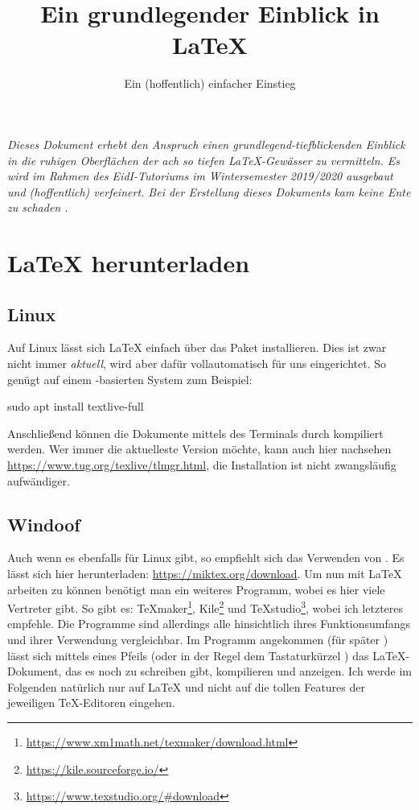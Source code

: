 \documentclass{pnp-skywrath-documentclass/pnp-skywrath}
\title{Ein grundlegender Einblick in \LaTeX}
\subtitle{Ein (hoffentlich) einfacher Einstieg}
\begin{document}
\maketitle
\TableOfContents

\textit{Dieses Dokument erhebt den Anspruch einen grundlegend-tiefblickenden Einblick in die ruhigen Oberflächen der ach so tiefen \LaTeX-Gewässer zu vermitteln. Es wird im Rahmen des EidI-Tutoriums im Wintersemester 2019/2020 ausgebaut und (hoffentlich) verfeinert. Bei der Erstellung dieses Dokuments kam keine Ente zu schaden \tduck.}

\section{\LaTeX{} herunterladen}
\subsection{\faLinux{~} Linux}

Auf Linux lässt sich \LaTeX{} einfach über das Paket  installieren. Dies ist zwar nicht immer \emph{aktuell}, wird aber dafür vollautomatisch für uns eingerichtet. So genügt auf einem -basierten System zum Beispiel:
\begin{bash*}
sudo apt install textlive-full
\end{bash*}
Anschließend können die Dokumente mittels des Terminals durch  kompiliert werden.\newline
Wer immer die aktuelleste Version möchte, kann auch hier nachsehen \url{https://www.tug.org/texlive/tlmgr.html}, die Installation ist nicht zwangsläufig aufwändiger.

\subsection{\faWindows{~} Windoof}

Auch wenn es  ebenfalls für Linux gibt, so empfiehlt sich das Verwenden von . Es lässt sich hier herunterladen: \url{https://miktex.org/download}. Um nun mit \LaTeX{} arbeiten zu können benötigt man ein weiteres Programm, wobei es hier viele Vertreter gibt. So gibt es: TeXmaker\footnote{\url{https://www.xm1math.net/texmaker/download.html}}, Kile\footnote{\url{https://kile.sourceforge.io/}} und TeXstudio\footnote{\url{https://www.texstudio.org/\#download}}, wobei ich letzteres empfehle. Die Programme sind allerdings alle hinsichtlich ihres Funktionsumfangs und ihrer Verwendung vergleichbar. Im Programm angekommen (für später \Smiley) lässt sich mittels eines Pfeils (oder in der Regel dem Tastaturkürzel ) das \LaTeX-Dokument, das es noch zu schreiben gibt, kompilieren und anzeigen. Ich werde im Folgenden natürlich nur auf \LaTeX{} und nicht auf die tollen Features der jeweiligen \TeX-Editoren eingehen.
\end{document}
